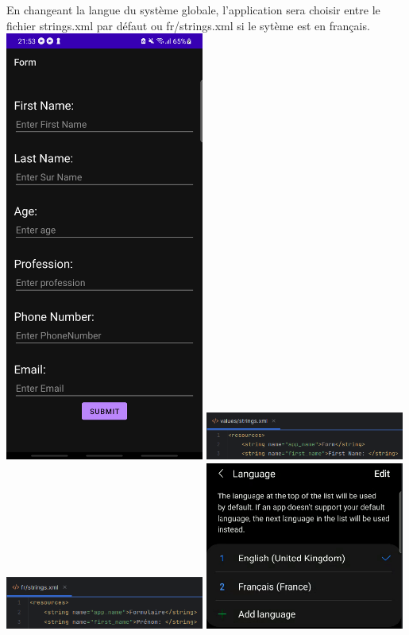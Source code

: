 \documentclass[a4paper]{article}
\begin{document}
\begin{multicols}{2}
    En changeant la langue du système globale, l'application sera choisir entre le fichier strings.xml par défaut ou fr/strings.xml si le sytème est en français.
  \includegraphics[width=0.49\textwidth]{screenshotFormulaireInternational}
  \includegraphics[width=0.49\textwidth]{international/ressourcesEn}
  \includegraphics[width=0.49\textwidth]{international/ressourcesFr}
  \includegraphics[width=0.49\textwidth]{international/settings}
  

\end{multicols}
\end{document}
